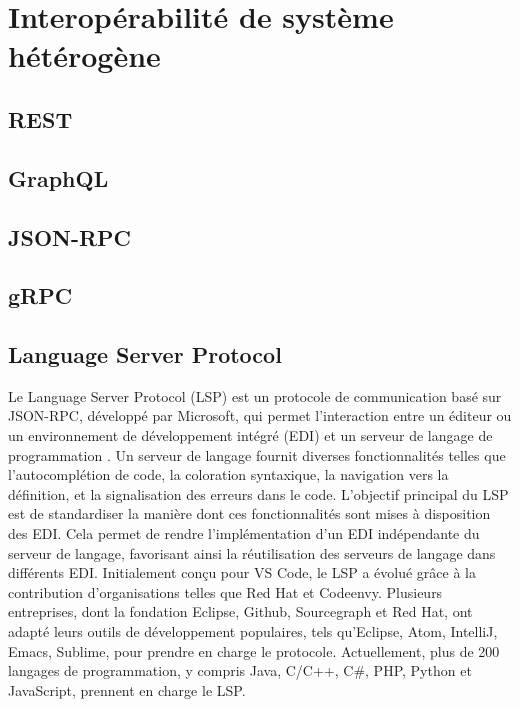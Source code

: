 \section{Interopérabilité de système hétérogène}

\subsection{REST}

\subsection{GraphQL}

\subsection{JSON-RPC}

\subsection{gRPC}

\subsection{Language Server Protocol}

Le Language Server Protocol (LSP) est un protocole de communication basé sur JSON-RPC, développé par Microsoft, qui permet l'interaction entre un éditeur ou un environnement de développement intégré (EDI) et un serveur de langage de programmation \cite{Keidel2016}. Un serveur de langage fournit diverses fonctionnalités telles que l'autocomplétion de code, la coloration syntaxique, la navigation vers la définition, et la signalisation des erreurs dans le code. L'objectif principal du LSP est de standardiser la manière dont ces fonctionnalités sont mises à disposition des EDI. Cela permet de rendre l'implémentation d'un EDI indépendante du serveur de langage, favorisant ainsi la réutilisation des serveurs de langage dans différents EDI. Initialement conçu pour VS Code, le LSP a évolué grâce à la contribution d'organisations telles que Red Hat et Codeenvy. Plusieurs entreprises, dont la fondation Eclipse, Github, Sourcegraph et Red Hat, ont adapté leurs outils de développement populaires, tels qu'Eclipse, Atom, IntelliJ, Emacs, Sublime, pour prendre en charge le protocole. Actuellement, plus de 200 langages de programmation, y compris Java, C/C++, C\#, PHP, Python et JavaScript, prennent en charge le LSP.


